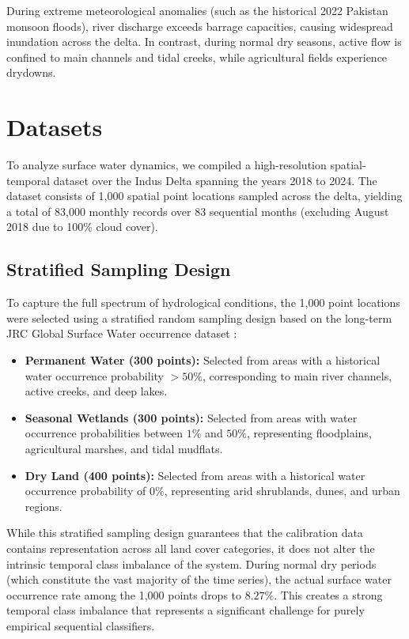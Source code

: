 \documentclass[12pt, a4paper]{article}
\begin{document}
During extreme meteorological anomalies (such as the historical 2022 Pakistan monsoon floods), river discharge exceeds barrage capacities, causing widespread inundation across the delta. In contrast, during normal dry seasons, active flow is confined to main channels and tidal creeks, while agricultural fields experience drydowns.


\section{Datasets}
To analyze surface water dynamics, we compiled a high-resolution spatial-temporal dataset over the Indus Delta spanning the years 2018 to 2024. The dataset consists of 1,000 spatial point locations sampled across the delta, yielding a total of 83,000 monthly records over 83 sequential months (excluding August 2018 due to 100\% cloud cover).

\subsection{Stratified Sampling Design}
To capture the full spectrum of hydrological conditions, the 1,000 point locations were selected using a stratified random sampling design based on the long-term JRC Global Surface Water occurrence dataset \citep{Pekel2016Highresolution}:
\begin{itemize}
    \item \textbf{Permanent Water (300 points):} Selected from areas with a historical water occurrence probability $> 50\%$, corresponding to main river channels, active creeks, and deep lakes.
    \item \textbf{Seasonal Wetlands (300 points):} Selected from areas with water occurrence probabilities between $1\%$ and $50\%$, representing floodplains, agricultural marshes, and tidal mudflats.
    \item \textbf{Dry Land (400 points):} Selected from areas with a historical water occurrence probability of $0\%$, representing arid shrublands, dunes, and urban regions.
\end{itemize}

While this stratified sampling design guarantees that the calibration data contains representation across all land cover categories, it does not alter the intrinsic temporal class imbalance of the system. During normal dry periods (which constitute the vast majority of the time series), the actual surface water occurrence rate among the 1,000 points drops to $8.27\%$. This creates a strong temporal class imbalance that represents a significant challenge for purely empirical sequential classifiers.
\end{document}
